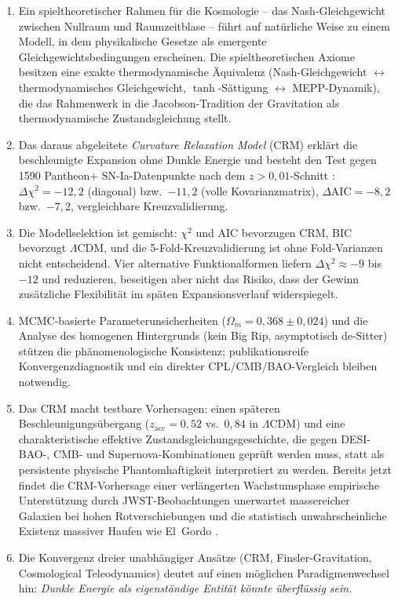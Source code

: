 \documentclass[aps,prd,twocolumn,superscriptaddress,nofootinbib]{revtex4-2}
\begin{document}
\begin{enumerate}
\item Ein spieltheoretischer Rahmen für die Kosmologie -- das Nash-Gleichgewicht zwischen Nullraum und Raumzeitblase -- führt auf natürliche Weise zu einem Modell, in dem physikalische Gesetze als emergente Gleichgewichtsbedingungen erscheinen. Die spieltheoretischen Axiome besitzen eine exakte thermodynamische Äquivalenz (Nash-Gleichgewicht $\leftrightarrow$ thermodynamisches Gleichgewicht, $\tanh$-Sättigung $\leftrightarrow$ MEPP-Dynamik), die das Rahmenwerk in die Jacobson-Tradition der Gravitation als thermodynamische Zustandsgleichung \cite{Jacobson1995} stellt.
\item Das daraus abgeleitete \textit{Curvature Relaxation Model} (CRM) erklärt die beschleunigte Expansion ohne Dunkle Energie und besteht den Test gegen 1590 Pantheon+ SN-Ia-Datenpunkte nach dem $z>0{,}01$-Schnitt \cite{Scolnic2022}: $\Delta\chi^2 = -12{,}2$ (diagonal) bzw.\ $-11{,}2$ (volle Kovarianzmatrix), $\Delta\mathrm{AIC} = -8{,}2$ bzw.\ $-7{,}2$, vergleichbare Kreuzvalidierung.
\item Die Modellselektion ist gemischt: $\chi^2$ und AIC bevorzugen CRM, BIC bevorzugt $\Lambda$CDM, und die 5-Fold-Kreuzvalidierung ist ohne Fold-Varianzen nicht entscheidend. Vier alternative Funktionalformen liefern $\Delta\chi^2 \approx -9$ bis $-12$ und reduzieren, beseitigen aber nicht das Risiko, dass der Gewinn zusätzliche Flexibilität im späten Expansionsverlauf widerspiegelt.
\item MCMC-basierte Parameterunsicherheiten ($\Omega_m = 0{,}368 \pm 0{,}024$) und die Analyse des homogenen Hintergrunds (kein Big Rip, asymptotisch de-Sitter) stützen die phänomenologische Konsistenz; publikationsreife Konvergenzdiagnostik und ein direkter CPL/CMB/BAO-Vergleich bleiben notwendig.
\item Das CRM macht testbare Vorhersagen: einen späteren Beschleunigungsübergang ($z_{\mathrm{acc}} = 0{,}52$ vs.\ $0{,}84$ in $\Lambda$CDM) und eine charakteristische effektive Zustandsgleichungsgeschichte, die gegen DESI-BAO-, CMB- und Supernova-Kombinationen geprüft werden muss, statt als persistente physische Phantomhaftigkeit interpretiert zu werden. Bereits jetzt findet die CRM-Vorhersage einer verlängerten Wachstumsphase empirische Unterstützung durch JWST-Beobachtungen unerwartet massereicher Galaxien bei hohen Rotverschiebungen \cite{Labbe2023, BoylanKolchin2023} und die statistisch un\-wahrscheinliche Existenz massiver Haufen wie El~Gordo \cite{Asencio2023}.
\item Die Konvergenz dreier unabhängiger Ansätze (CRM, Finsler-Gravitation, Cosmological Teleodynamics) deutet auf einen möglichen Paradigmenwechsel hin: \textit{Dunkle Energie als eigenständige Entität könnte überflüssig sein.}
\end{enumerate}
\end{document}
